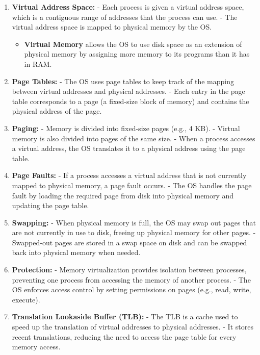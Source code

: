 \documentclass{report}
\begin{document}
\begin{enumerate}
	\item \textbf{Virtual Address Space:}
	      - Each process is given a virtual address space, which is a contiguous range of addresses that the process can use.
	      - The virtual address space is mapped to physical memory by the OS.
	      \begin{itemize}
		      \item \textbf{Virtual Memory} allows the OS to use disk space as an extension of physical memory by assigning more memory to its programs than it has in RAM.
	      \end{itemize}

	\item \textbf{Page Tables:}
	      - The OS uses page tables to keep track of the mapping between virtual addresses and physical addresses.
	      - Each entry in the page table corresponds to a page (a fixed-size block of memory) and contains the physical address of the page.

	\item \textbf{Paging:}
	      - Memory is divided into fixed-size pages (e.g., 4 KB).
	      - Virtual memory is also divided into pages of the same size.
	      - When a process accesses a virtual address, the OS translates it to a physical address using the page table.

	\item \textbf{Page Faults:}
	      - If a process accesses a virtual address that is not currently mapped to physical memory, a page fault occurs.
	      - The OS handles the page fault by loading the required page from disk into physical memory and updating the page table.

	\item \textbf{Swapping:}
	      - When physical memory is full, the OS may swap out pages that are not currently in use to disk, freeing up physical memory for other pages.
	      - Swapped-out pages are stored in a swap space on disk and can be swapped back into physical memory when needed.

	\item \textbf{Protection:}
	      - Memory virtualization provides isolation between processes, preventing one process from accessing the memory of another process.
	      - The OS enforces access control by setting permissions on pages (e.g., read, write, execute).

	\item \textbf{Translation Lookaside Buffer (TLB):}
	      - The TLB is a cache used to speed up the translation of virtual addresses to physical addresses.
	      - It stores recent translations, reducing the need to access the page table for every memory access.

\end{enumerate}
\end{document}
